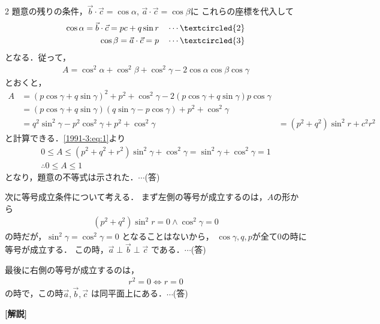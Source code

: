 \documentclass[../../../../main.tex]{subfiles}
\begin{document}
\begin{multicols}{2}
  題意の残りの条件，$\vec{b}\cdot\vec{c}=\cos\alpha$, $\vec{a}\cdot\vec{c}=\cos\beta$に
  これらの座標を代入して
  \begin{align*}
    \cos \alpha = \vec{b} \cdot \vec{c} = pc + q \sin r \quad \cdots \textcircled{2} \\
    \cos \beta = \vec{a} \cdot \vec{c} = p \quad \cdots \textcircled{3}
  \end{align*}
  となる．従って，
  \begin{align*}
    A = \cos^2 \alpha+ \cos^2 \beta + \cos^2 \gamma - 2\cos \alpha \cos \beta \cos \gamma
  \end{align*}
  とおくと，
  \begin{align*}
    A & = (p\cos\gamma + q \sin\gamma)^2 + p^2 + \cos^2 \gamma - 2(p\cos\gamma + q \sin \gamma) p \cos\gamma \\
      & = (p\cos\gamma + q \sin \gamma)(q \sin \gamma - p\cos\gamma) + p^2 + \cos^2\gamma                    \\
      & = q^2 \sin^2 \gamma - p^2 \cos^2\gamma + p^2 + \cos^2 \gamma
      & = (p^2 + q^2) \sin^2 r + c^2 r^2
  \end{align*}
  と計算できる．\cref{1991-3:eq:1}より
  \begin{align*}
    0 \le A \le (p^2 + q^2 + r^2) \sin^2 \gamma + \cos^2 \gamma = \sin^2 \gamma + \cos^2 \gamma = 1 \\
    \therefore
    0 \le A \le 1
  \end{align*}
  となり，題意の不等式は示された．$\cdots$(答)

  \vspace{10pt}
  次に等号成立条件について考える．
  まず左側の等号が成立するのは，$A$の形から
  \begin{align*}
    (p^2+q^2) \sin^2 r = 0 \land \cos^2 \gamma = 0
  \end{align*}
  の時だが，$\sin^2 \gamma = \cos^2 \gamma = 0$ となることはないから，
  $\cos\gamma, q, p$が全て$0$の時に等号が成立する．
  この時，$\vec{a} \perp \vec{b} \perp \vec{c}$ である．$\cdots$(答)

  \vspace{10pt}
  最後に右側の等号が成立するのは，
  \begin{align*}
    r^2 = 0 \iff r=0
  \end{align*}
  の時で，この時$\vec{a}, \vec{b}, \vec{c}$ は同平面上にある．$\cdots$(答)

  \vspace{10pt}
  {\bf[解説]}

  \newpage
\end{multicols}
\end{document}
